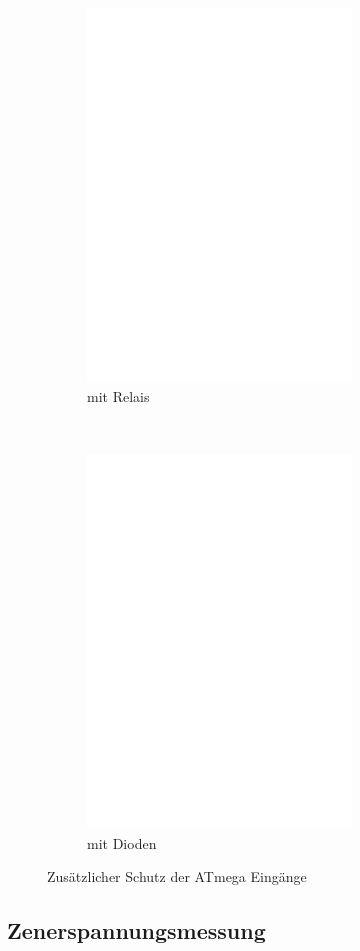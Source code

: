 \begin{figure}[H]
  \begin{subfigure}[b]{9cm}
    \centering
    \includegraphics[width=7cm]{../FIG/relay_addon.eps}
    \caption{mit Relais}
  \end{subfigure}
  ~
  \begin{subfigure}[b]{9cm}
    \centering
    \includegraphics[width=7cm]{../FIG/diode_addon.eps}
    \caption{mit Dioden}
  \end{subfigure}
  \caption{Zusätzlicher Schutz der ATmega Eingänge}
  \label{fig:relay_addon}
\end{figure}

\subsection{Zenerspannungsmessung}

